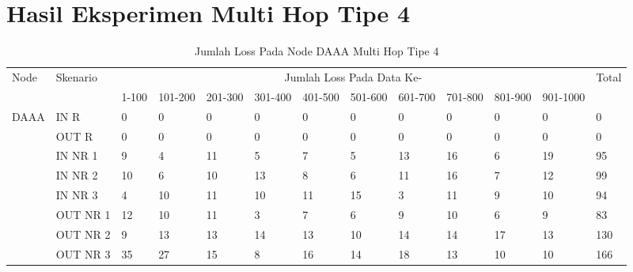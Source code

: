 \chapter{Hasil Eksperimen Multi Hop Tipe 4}
\label{lamp:F}

\begin{table}[H]
  \centering
  \caption{Jumlah Loss Pada Node DAAA Multi Hop Tipe 4}
    \begin{tabular}{|p{1cm}|p{1.9cm}|p{0.6cm}|p{0.6cm}|p{0.6cm}|p{0.6cm}|p{0.6cm}|p{0.6cm}|p{0.6cm}|p{0.6cm}|p{0.6cm}|p{0.6cm}|p{1cm}|}
    \hline
        \multirow{2}{*}{Node}&\multirow{2}{*}{Skenario}&\multicolumn{10}{|c|}{Jumlah Loss Pada Data Ke-}&\multirow{2}{*}{Total} \\\cline{3-12}
          & & 1-100 & 101-200 & 201-300 & 301-400 & 401-500 & 501-600 & 601-700 & 701-800 & 801-900 & 901-1000 & \\
        \hline
    \multirow{8}{*}{DAAA}  
    & IN R  & 0     & 0     & 0     & 0     & 0     & 0     & 0     & 0     & 0     & 0     & 0 \\
          & OUT R & 0     & 0     & 0     & 0     & 0     & 0     & 0     & 0     & 0     & 0     & 0 \\
          & IN NR 1 & 9     & 4     & 11    & 5     & 7     & 5     & 13    & 16    & 6     & 19    & 95 \\
          & IN NR 2 & 10    & 6     & 10    & 13    & 8     & 6     & 11    & 16    & 7     & 12    & 99 \\
          & IN NR 3 & 4     & 10    & 11    & 10    & 11    & 15    & 3     & 11    & 9     & 10    & 94 \\
          & OUT NR 1 & 12    & 10    & 11    & 3     & 7     & 6     & 9     & 10    & 6     & 9     & 83 \\
          & OUT NR 2 & 9     & 13    & 13    & 14    & 13    & 10    & 14    & 14    & 17    & 13    & 130 \\
          & OUT NR 3 & 35    & 27    & 15    & 8     & 16    & 14    & 18    & 13    & 10    & 10    & 166 \\
    
    \hline
    \end{tabular}%
  \label{tab:addlabel}%
\end{table}%

